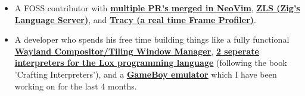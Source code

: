 \documentclass[9pt]{developercv} %
\begin{document}
\vspace{0.5cm} %



\begin{itemize}[leftmargin=\parindent, leftmargin=*]
  \item
    A FOSS contributor with
    \href{https://github.com/neovim/neovim/issues?q=is%3Apr%20author%3AThe-Briel-Deal}{\ul{\textbf{multiple
    PR's merged in NeoVim}}},
    \href{https://github.com/zigtools/zls/issues?q=is%3Apr%20author%3AThe-Briel-Deal}{\ul{\textbf{ZLS
    (Zig's Language Server)}}}, and
    \href{https://github.com/wolfpld/tracy/pulls?q=is%3Apr+author%3AThe-Briel-Deal}{\ul{\textbf{Tracy
    (a real time Frame Profiler)}}}.
    
  \item
    A developer who spends his free time building things like a fully
    functional
    \href{https://github.com/The-Briel-Deal/HotWl}{\ul{\textbf{Wayland
    Compositor/Tiling Window Manager}}},
    \href{https://github.com/The-Briel-Deal/crafting-interpreters}{\ul{\textbf{2
    seperate interpreters for the Lox programming language}}} (following the
    book 'Crafting Interpreters'), and a
    \href{https://github.com/The-Briel-Deal/gfgb}{\ul{\textbf{GameBoy
    emulator}}} which I have been working on for the last 4 months.
\end{itemize}

\end{document}
